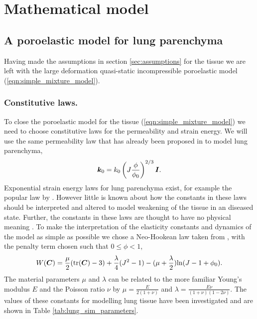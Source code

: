 \section{Mathematical model}
\label{section:lung_model}

\subsection{A poroelastic model for lung parenchyma} 
Having made the assumptions in section \ref{sec:assumptions} for the tissue we are left with the large deformation quasi-static incompressible poroelastic model (\ref{eqn:simple_mixture_model}).%
\subsubsection{Constitutive laws.}
\label{sec:constitutive}
To close the poroelastic model for the tissue (\ref{eqn:simple_mixture_model}) we need to choose constitutive laws for the permeability and strain energy. We will use the same permeability law that has already been proposed in \cite{kowalczyk1994modelling} to model lung parenchyma,
\begin{equation}
\boldsymbol{k}_{0} = {k}_{0} \left( J \frac{  \phi  }{\phi_{0}} \right)^{2/3} \boldsymbol{I}.
\label{eqn:perm_law}
\end{equation}
%
Exponential strain energy laws for lung parenchyma exist, for example the popular law by \cite{fung1975stress}. However little is known about how the constants in these laws should be interpreted and altered to model weakening of the tissue in an diseased state. Further, the constants in these laws are thought to have no physical meaning \cite{tawhai2009supine}. To make the interpretation of the elasticity constants and dynamics of the model as simple as possible we chose a Neo-Hookean law taken from \cite{wriggers2008nonlinear}, with the penalty term chosen such that $0\leq\phi<1$,
%
\begin{equation}
W(\boldsymbol{C})=\frac{\mu}{2}(\mbox{tr}(\boldsymbol{C})-3)+\frac{\lambda}{4}(J^{2}-1)-(\mu+\frac{\lambda}{2})\mbox{ln}(J-1+\phi_{0}).
\label{eqn:Neo_Hookean}
\end{equation}
The material parameters $\mu$ and $\lambda$ can be related to the more familiar Young's modulus $E$ and the Poisson ratio $\nu$ by $\mu=\frac{E}{2(1+\nu)}$ and  $\lambda=\frac{E\nu}{(1+\nu)(1-2\nu)}$. The values of these constants for modelling lung tissue have been investigated \cite{zhang2004technical,werner2009patient,de1981model} and are shown in Table \ref{tab:lung_sim_parameters}.



